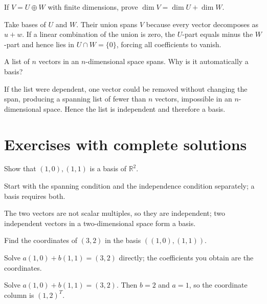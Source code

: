 \begin{problem}\label{prob:i03-problem-11}
If $V=U\oplus W$ with finite dimensions, prove $\dim V=\dim U+\dim W$.
\end{problem}
\begin{solution}
Take bases of $U$ and $W$. Their union spans $V$ because every vector decomposes as $u+w$. If a linear combination of the union is zero, the $U$-part equals minus the $W$-part and hence lies in $U\cap W=\{0\}$, forcing all coefficients to vanish.
\end{solution}

\begin{problem}\label{prob:i03-problem-12}
A list of $n$ vectors in an $n$-dimensional space spans. Why is it automatically a basis?
\end{problem}
\begin{solution}
If the list were dependent, one vector could be removed without changing the span, producing a spanning list of fewer than $n$ vectors, impossible in an $n$-dimensional space. Hence the list is independent and therefore a basis.
\end{solution}


\section{Exercises with complete solutions}

\begin{exercise}\label{exr:i03-01}
Show that $(1,0),(1,1)$ is a basis of $\mathbb R^2$.
\end{exercise}
\begin{hint}
Start with the spanning condition and the independence condition separately; a basis requires both.
\end{hint}
\begin{solution}
The two vectors are not scalar multiples, so they are independent; two independent vectors in a two-dimensional space form a basis.
\end{solution}

\begin{exercise}\label{exr:i03-02}
Find the coordinates of $(3,2)$ in the basis $((1,0),(1,1))$.
\end{exercise}
\begin{hint}
Solve \(a(1,0)+b(1,1)=(3,2)\) directly; the coefficients you obtain are the coordinates.
\end{hint}
\begin{solution}
Solve $a(1,0)+b(1,1)=(3,2)$. Then $b=2$ and $a=1$, so the coordinate column is $(1,2)^T$.
\end{solution}

